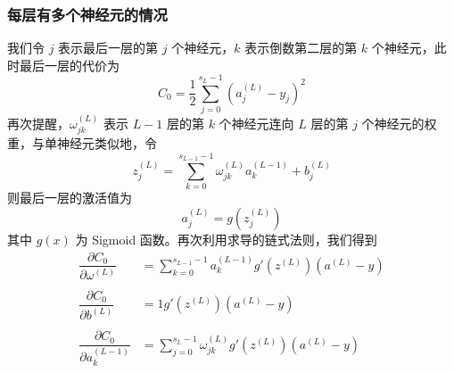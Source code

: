 \subsubsection{每层有多个神经元的情况}
我们令 $j$ 表示最后一层的第 $j$ 个神经元，$k$ 表示倒数第二层的第 $k$ 个神经元，此时最后一层的代价为
\begin{equation}
    C_0 = \dfrac 12 \sum\limits_{j=0}^{s_L-1}{\left(a_j^{(L)} - y_j\right)^2}
\end{equation}
再次提醒，$\omega^{(L)}_{jk}$ 表示 $L - 1$ 层的第 $k$ 个神经元连向 $L$ 层的第 $j$ 个神经元的权重，与单神经元类似地，令
\begin{equation}
    z_j^{(L)} = \sum\limits_{k=0}^{s_{L-1}-1} {\omega_{jk}^{(L)}a_k^{(L-1)}} + b_j^{(L)}
\end{equation}
则最后一层的激活值为
\begin{equation}
    a_j^{(L)} = g\left(z_j^{(L)}\right)
\end{equation}
其中 $g(x)$ 为 Sigmoid 函数。再次利用求导的链式法则，我们得到
\begin{equation}
    \begin{aligned}
        \dfrac{\partial C_0}{\partial \omega^{(L)}} &= \sum\limits_{k=0}^{s_{L-1}-1}a_k^{(L-1)}g'\left(z^{(L)}\right)\left(a^{(L)} - y\right) \\
        \\
        \dfrac{\partial C_0}{\partial b^{(L)}} &= 1g'\left(z^{(L)}\right)\left(a^{(L)} - y\right) \\
        \\
        \dfrac{\partial C_0}{\partial a_k^{(L-1)}} &= \sum\limits_{j=0}^{s_L-1}\omega_{jk}^{(L)}g'\left(z^{(L)}\right)\left(a^{(L)} - y\right)
        \end{aligned}
\end{equation}

